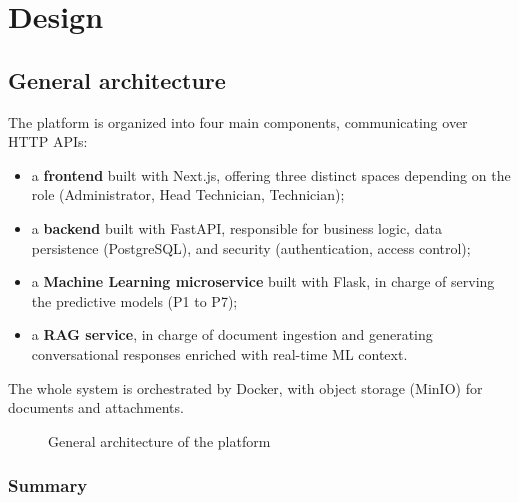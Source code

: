 \chapter{Design}

\section{General architecture}

The platform is organized into four main components, communicating over HTTP APIs:
\begin{itemize}
\item a \textbf{frontend} built with Next.js, offering three distinct spaces depending on the role (Administrator, Head Technician, Technician);
\item a \textbf{backend} built with FastAPI, responsible for business logic, data persistence (PostgreSQL), and security (authentication, access control);
\item a \textbf{Machine Learning microservice} built with Flask, in charge of serving the predictive models (P1 to P7);
\item a \textbf{RAG service}, in charge of document ingestion and generating conversational responses enriched with real-time ML context.
\end{itemize}

The whole system is orchestrated by Docker, with object storage (MinIO) for documents and attachments.

\begin{figure}[h]
\centering
{}
\caption{General architecture of the platform}
\label{fig:architecture}
\end{figure}

\subsection{Summary}

